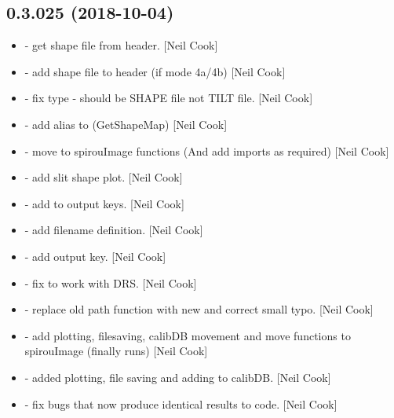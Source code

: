 \documentclass[a4paper,10pt,english]{report}
\begin{document}
\subsection{0.3.025 (2018-10-04)}
\label{\detokenize{misc/changelog:id307}}\begin{itemize}
\item {} 
 - get shape file from header. {[}Neil Cook{]}

\item {} 
 - add shape file to header (if mode 4a/4b)
{[}Neil Cook{]}

\item {} 
 - fix type - should be SHAPE file not TILT file.
{[}Neil Cook{]}

\item {} 
 - add alias to  (GetShapeMap)
{[}Neil Cook{]}

\item {} 
 - move  to spirouImage functions (And add
imports as required) {[}Neil Cook{]}

\item {} 
 - add slit shape plot. {[}Neil Cook{]}

\item {} 
 - add  to output keys. {[}Neil Cook{]}

\item {} 
 - add  filename definition. {[}Neil Cook{]}

\item {} 
 - add  output key. {[}Neil Cook{]}

\item {} 
 - fix to work with DRS. {[}Neil Cook{]}

\item {} 
 - replace old path function with new and correct
small typo. {[}Neil Cook{]}

\item {} 
 - add plotting, filesaving, calibDB movement and
move functions to spirouImage (finally runs) {[}Neil Cook{]}

\item {} 
 - added plotting, file saving and adding to
calibDB. {[}Neil Cook{]}

\item {} 
 - fix bugs that now produce identical results to
 code. {[}Neil Cook{]}

\end{itemize}
\end{document}
